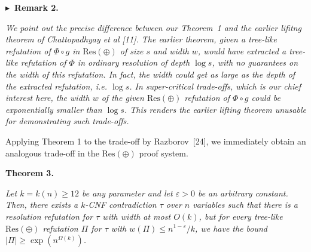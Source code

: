 



\par\medskip\noindent\textbf{
$\blacktriangleright$ Remark 2.
}\par



\emph{We point out the precise difference between our Theorem 1 and the earlier lifitng theorem of Chattopadhyay et al [11]. The earlier theorem, given a tree-like refutation of $\Phi\circ g$ in $\text{Res}(\oplus)$ of size $s$ and width $w$, would have extracted a tree-like refutation of $\Phi$ in ordinary resolution of depth $\log s$, with no guarantees on the width of this refutation. In fact, the width could get as large as the depth of the extracted refutation, i.e. $\log s$. In super-critical trade-offs, which is our chief interest here, the width $w$ of the given $\text{Res}(\oplus)$ refutation of $\Phi\circ g$ could be exponentially smaller than $\log s$. This renders the earlier lifting theorem unusable for demonstrating such trade-offs.}\par






Applying Theorem 1 to the trade-off by Razborov [24], we immediately obtain an analogous trade-off in the $\text{Res}(\oplus)$ proof system.\par





\par\medskip\noindent\textbf{
\textbf{Theorem 3}\textbf{.}
}\par



\emph{Let $k=k(n)\geq 12$ be any parameter and let $\varepsilon>0$ be an arbitrary constant.
Then, there exists a $k$-CNF contradiction $\tau$ over $n$ variables such that there is a resolution refutation for $\tau$ with width at most $O(k)$, but for every tree-like $\text{Res}(\oplus)$ refutation $\Pi$ for $\tau$ with $w(\Pi)\leq n^{1-\varepsilon}/k$, we have the bound $|\Pi|\geq\exp(n^{\Omega(k)})$.}\par






